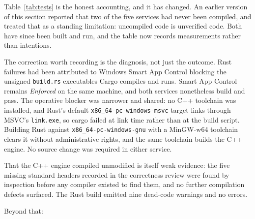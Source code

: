 \documentclass[11pt]{article}
\newcommand{\code}[1]{\texttt{\small #1}}
\begin{document}
Table~\ref{tab:tests} is the honest accounting, and it has changed. An earlier
version of this section reported that two of the five services had never been
compiled, and treated that as a standing limitation: uncompiled code is
unverified code. Both have since been built and run, and the table now records
measurements rather than intentions.

The correction worth recording is the diagnosis, not just the outcome. Rust
failures had been attributed to Windows Smart App Control blocking the unsigned
\code{build.rs} executables Cargo compiles and runs. Smart App Control remains
\emph{Enforced} on the same machine, and both services nonetheless build and pass.
The operative blocker was narrower and shared: no C++ toolchain was installed, and
Rust's default \code{x86\_64-pc-windows-msvc} target links through MSVC's
\code{link.exe}, so cargo failed at link time rather than at the build script.
Building Rust against \code{x86\_64-pc-windows-gnu} with a MinGW-w64 toolchain
clears it without administrative rights, and the same toolchain builds the C++
engine. No source change was required in either service.

That the C++ engine compiled unmodified is itself weak evidence: the five missing
standard headers recorded in the correctness review were found by inspection
before any compiler existed to find them, and no further compilation defects
surfaced. The Rust build emitted nine dead-code warnings and no errors.

Beyond that:
\end{document}
